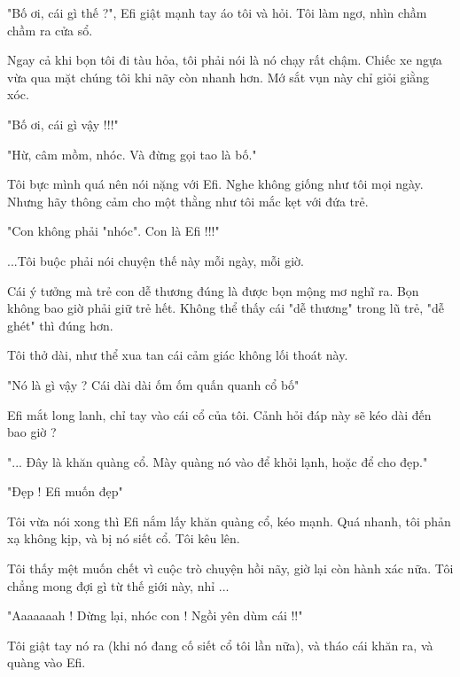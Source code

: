 
"Bố ơi, cái gì thế ?", Efi giật mạnh tay áo tôi và hỏi. Tôi làm ngơ, nhìn chầm chầm ra cửa sổ. 

Ngay cả khi bọn tôi đi tàu hỏa, tôi phải nói là nó chạy rất chậm. Chiếc xe ngựa vừa qua mặt chúng tôi khi nãy còn nhanh hơn. Mớ sắt vụn này chỉ giỏi giằng xóc.  

"Bố ơi, cái gì vậy !!!"

"Hừ, câm mồm, nhóc. Và đừng gọi tao là bố."

Tôi bực mình quá nên nói nặng với Efi. Nghe không giống như tôi mọi ngày. Nhưng hãy thông cảm cho một thằng như tôi mắc kẹt với đứa trẻ.

"Con không phải "nhóc". Con là Efi !!!"

...Tôi buộc phải nói chuyện thế này mỗi ngày, mỗi giờ. 

Cái ý tưởng mà trẻ con dễ thương đúng là được bọn mộng mơ nghĩ ra. Bọn không bao giờ phải giữ trẻ hết. Không thể thấy cái "dễ thương" trong lũ trẻ, "dễ ghét" thì đúng hơn.

Tôi thở dài, như thể xua tan cái cảm giác không lối thoát này.

"Nó là gì vậy ? Cái dài dài ốm ốm quấn quanh cổ bố"

Efi mắt long lanh, chỉ tay vào cái cổ của tôi. Cảnh hỏi đáp này sẽ kéo dài đến bao giờ ?

"... Đây là khăn quàng cổ. Mày quàng nó vào để khỏi lạnh, hoặc để cho đẹp."

"Đẹp ! Efi muốn đẹp"

Tôi vừa nói xong thì Efi nắm lấy khăn quàng cổ, kéo mạnh. Quá nhanh, tôi phản xạ không kịp, và bị nó siết cổ. Tôi kêu lên.

Tôi thấy mệt muốn chết vì cuộc trò chuyện hồi nãy, giờ lại còn hành xác nữa. Tôi chẳng mong đợi gì từ thế giới này, nhỉ ...

"Aaaaaaah ! Dừng lại, nhóc con ! Ngồi yên dùm cái !!"

Tôi giật tay nó ra (khi nó đang cố siết cổ tôi lần nữa), và tháo cái khăn ra, và quàng vào Efi. 

